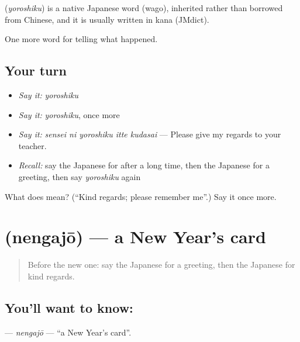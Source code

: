 \begin{cousinweb}
\textbf{} (\emph{yoroshiku}) is a native Japanese word (wago), inherited rather than borrowed from Chinese, and it is usually written in kana (JMdict).
\end{cousinweb}

\begin{grammarlens}[title={What you've built}]
One more word for telling what happened.
\end{grammarlens}

\subsection*{Your turn}
\begin{itemize}
\raggedright
  \item \emph{Say it:} \emph{yoroshiku}
  \item \emph{Say it:} \emph{yoroshiku}, once more
  \item \emph{Say it:} \emph{sensei ni yoroshiku itte kudasai} — Please give my regards to your teacher.
  \item \emph{Recall:} say the Japanese for after a long time, then the Japanese for a greeting, then say \emph{yoroshiku} again
\end{itemize}

\begin{tcolorbox}[breakable,colback=teal!4,colframe=teal!35!black,title={Before you move on}]
What does  mean? (\textquotedblleft{}Kind regards; please remember me\textquotedblright{}.) Say it once more.
\end{tcolorbox}
\section[\texorpdfstring{\ja{ねんがじょう} (nengajō)}{ねんがじょう (nengajō)}]{ (nengajō) — a New Year's card}

\label{lesson:JA-C306-nengajou}



\begin{quote}
Before the new one: say the Japanese for a greeting, then the Japanese for kind regards.
\end{quote}

\subsection*{You'll want to know: }
\textbf{} — \emph{nengajō} — \textquotedblleft{}a New Year's card\textquotedblright{}.


